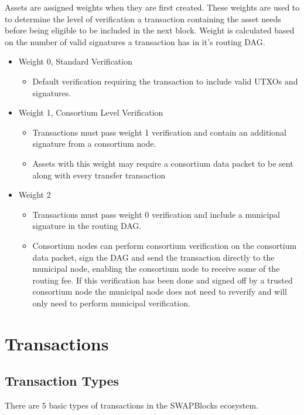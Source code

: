 \documentclass[12pt]{article}
\begin{document}
Assets are assigned weights when they are first created. These weights are used to
to determine the level of verification a transaction containing the asset needs before
being eligible to be
included in the next block. Weight is calculated based on the number of valid signatures
a transaction has in it's routing DAG.


\begin{itemize}
	\item Weight 0, Standard Verification
		\begin{itemize}
			\item{Default verification requiring the transaction to include
				valid UTXOs and signatures.}
		\end{itemize}
	\item Weight 1, Consortium Level Verification
		\begin{itemize}
			\item{Transactions must pass weight 1 verification and contain an
				additional signature from a consortium node.}
			\item{Assets with this weight may require a consortium data packet
				to be sent along with every transfer transaction}
		\end{itemize}
	\item Weight 2
		\begin{itemize}
			\item{Transactions must pass weight 0 verification and include a 
				municipal signature in the routing DAG.}
			\item{Consortium nodes can perform consortium verification on
				the consortium data packet, sign the DAG and send the
				transaction directly to the municipal node, enabling
				the consortium node to receive some of the routing fee.
				If this verification has been done and signed off by
				a trusted consortium node the municipal node does not
				need to reverify and will only need to
				perform municipal verification.}
		\end{itemize}
\end{itemize}



\section{Transactions}

\subsection{Transaction Types}
There are 5 basic types of transactions in the SWAPBlocks ecosystem.
\end{document}
